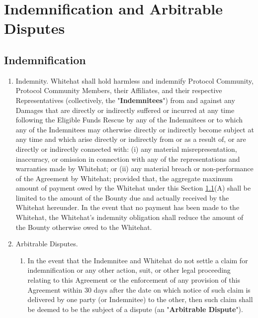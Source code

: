 \documentclass{article}
\begin{document}
\section{Indemnification and Arbitrable Disputes}\label{sec:indemnification}

\subsection{Indemnification}\label{subsec:indemnity}

\begin{enumerate}[label=\Alph*.]

    \item Indemnity. Whitehat shall hold harmless and indemnify Protocol Community, Protocol Community Members, their Affiliates, and their respective Representatives (collectively, the "\textbf{Indemnitees}") from and against any Damages that are directly or indirectly suffered or incurred at any time following the Eligible Funds Rescue by any of the Indemnitees or to which any of the Indemnitees may otherwise directly or indirectly become subject at any time and which arise directly or indirectly from or as a result of, or are directly or indirectly connected with: (i) any material misrepresentation, inaccuracy, or omission in connection with any of the representations and warranties made by Whitehat; or (ii) any material breach or non-performance of the Agreement by Whitehat; provided that, the aggregate maximum amount of payment owed by the Whitehat under this Section \ref{subsec:indemnity}(A) shall be limited to the amount of the Bounty due and actually received by the Whitehat hereunder. In the event that no payment has been made to the Whitehat, the Whitehat's indemnity obligation shall reduce the amount of the Bounty otherwise owed to the Whitehat.

    \item Arbitrable Disputes.\label{subsec:arbitrable_disputes}

          \begin{enumerate}

              \item In the event that the Indemnitee and Whitehat do not settle a claim for indemnification or any other action, suit, or other legal proceeding relating to this Agreement or the enforcement of any provision of this Agreement within 30 days after the date on which notice of such claim is delivered by one party (or Indemnitee) to the other, then such claim shall be deemed to be the subject of a dispute (an "\textbf{Arbitrable Dispute}").


\end{enumerate}
\end{enumerate}
\end{document}
